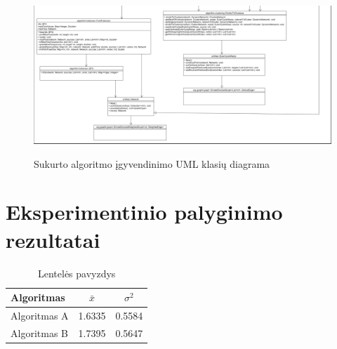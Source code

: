 \documentclass{VUMIFInfBakalaurinis}
\begin{document}
\begin{figure}[h]
	\caption{Sukurto algoritmo įgyvendinimo UML klasių diagrama}
	\centering
	\includegraphics[width=1.5\textwidth, height=0.6\textheight, angle=90]{img/architecture2.png}
	\label{fig:architecture2}
\end{figure}

\section{Eksperimentinio palyginimo rezultatai}
\begin{table}[H]\footnotesize
  \centering
  \caption{Lentelės pavyzdys}
  {\begin{tabular}{|l|c|c|} \hline
    Algoritmas & $\bar{x}$ & $\sigma^{2}$ \\
    \hline
    Algoritmas A  & 1.6335    & 0.5584       \\
    Algoritmas B  & 1.7395    & 0.5647       \\
    \hline
  \end{tabular}}
  \label{tab:table example}
\end{table}
\end{document}

